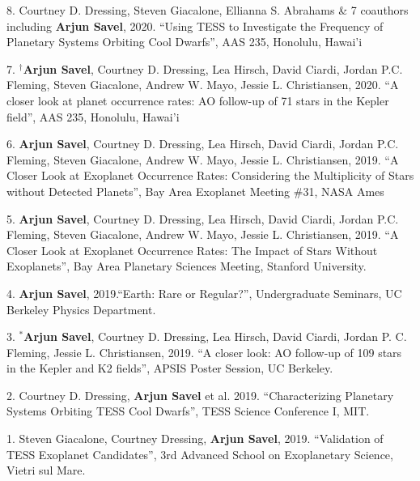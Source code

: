 \documentclass[12pt,letterpaper]{article}
\begin{document}
\begin{list}{}{\cvlist}

\item 8. Courtney D. Dressing, Steven Giacalone, Ellianna S. Abrahams \& 7 coauthors including \textbf{Arjun Savel}, 2020. ``Using TESS to Investigate the Frequency of Planetary Systems Orbiting Cool Dwarfs'', AAS 235, Honolulu, Hawai'i

\item 7. $^\dagger$\textbf{Arjun Savel}, Courtney D. Dressing, Lea Hirsch, David Ciardi, Jordan P.C. Fleming, Steven Giacalone, Andrew W. Mayo, Jessie L. Christiansen, 2020. “A closer look at planet occurrence rates: AO follow-up of 71 stars in the Kepler field”, AAS 235, Honolulu, Hawai'i

\item 6. \textbf{Arjun Savel}, Courtney D. Dressing, Lea Hirsch, David Ciardi, Jordan P.C. Fleming, Steven Giacalone, Andrew W. Mayo, Jessie L. Christiansen, 2019. “A Closer Look at Exoplanet Occurrence Rates: Considering the Multiplicity of Stars without Detected Planets”, Bay Area Exoplanet Meeting \#31, NASA Ames

\item 5. \textbf{Arjun Savel}, Courtney D. Dressing, Lea Hirsch, David Ciardi, Jordan P.C. Fleming, Steven Giacalone, Andrew W. Mayo, Jessie L. Christiansen, 2019. “A Closer Look at Exoplanet Occurrence Rates: The Impact of Stars Without Exoplanets”, Bay Area Planetary Sciences Meeting, Stanford University.

\item 4. \textbf{Arjun Savel}, 2019.“Earth: Rare or Regular?”, Undergraduate Seminars, UC Berkeley Physics Department.

\item 3. $^*$\textbf{Arjun Savel}, Courtney D. Dressing, Lea Hirsch, David Ciardi, Jordan P. C. Fleming, Jessie L. Christiansen, 2019. “A closer look: AO follow-up of 109 stars in the Kepler and K2 fields”, APSIS Poster Session, UC Berkeley.

\item 2. Courtney D. Dressing, \textbf{ Arjun Savel} et al. 2019. “Characterizing Planetary Systems Orbiting TESS Cool Dwarfs”, TESS Science Conference I, MIT.

\item 1. Steven Giacalone, Courtney Dressing, \textbf{Arjun Savel}, 2019. “Validation of TESS Exoplanet Candidates”, 3rd Advanced School on Exoplanetary Science, Vietri sul Mare.

\end{list}
\end{document}
